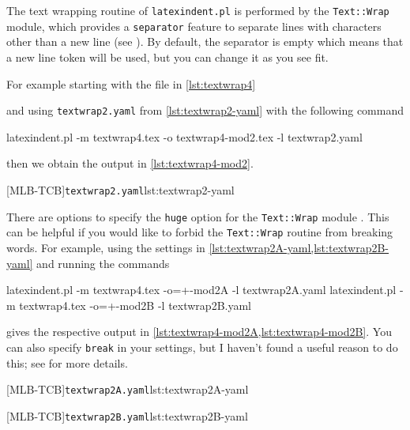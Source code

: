 
	The text wrapping routine of \texttt{latexindent.pl} is performed by the
	\texttt{Text::Wrap} module, which provides a \texttt{separator} feature
	to separate lines with characters other than a new line (see
	\cite{textwrap}). By default, the separator is empty which means that a new
	line token will be used, but you can change it as you see fit.

	For example starting with the file in \cref{lst:textwrap4}

	and using \texttt{textwrap2.yaml} from \cref{lst:textwrap2-yaml} with the following
	command
	\begin{commandshell}
latexindent.pl -m textwrap4.tex -o textwrap4-mod2.tex -l textwrap2.yaml
\end{commandshell}
	then we obtain the output in \cref{lst:textwrap4-mod2}.

	\begin{cmhtcbraster}[raster column skip=.1\linewidth]
		[MLB-TCB]{\texttt{textwrap2.yaml}}{lst:textwrap2-yaml}
	\end{cmhtcbraster}

	There are options to specify the \texttt{huge} option for the
	\texttt{Text::Wrap} module \cite{textwrap}
	. This can be helpful if you would like to forbid the
	\texttt{Text::Wrap} routine from breaking words. For example, using the settings
	in \cref{lst:textwrap2A-yaml,lst:textwrap2B-yaml} and running the commands
	\begin{commandshell}
latexindent.pl -m textwrap4.tex -o=+-mod2A -l textwrap2A.yaml
latexindent.pl -m textwrap4.tex -o=+-mod2B -l textwrap2B.yaml
\end{commandshell}
	gives the respective output in \cref{lst:textwrap4-mod2A,lst:textwrap4-mod2B}. You can also specify
	\texttt{break} in your settings, but I haven't found a useful reason to do
	this; see \cite{textwrap} for more details.

	\begin{cmhtcbraster}[raster column skip=.1\linewidth]
		[MLB-TCB]{\texttt{textwrap2A.yaml}}{lst:textwrap2A-yaml}

		[MLB-TCB]{\texttt{textwrap2B.yaml}}{lst:textwrap2B-yaml}
	\end{cmhtcbraster}

